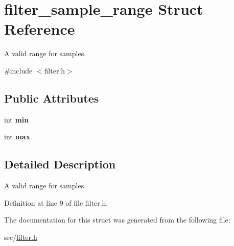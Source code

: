\hypertarget{structfilter__sample__range}{}\section{filter\+\_\+sample\+\_\+range Struct Reference}
\label{structfilter__sample__range}


A valid range for samples.  




{\ttfamily \#include $<$filter.\+h$>$}

\subsection*{Public Attributes}
\begin{DoxyCompactItemize}
\item 
\hypertarget{structfilter__sample__range_a304ee67b1a15b4a0f36ca190a56a38c7}{}int {\bfseries min}\label{structfilter__sample__range_a304ee67b1a15b4a0f36ca190a56a38c7}

\item 
\hypertarget{structfilter__sample__range_a0a29f8303981c999d499070d0a05e05d}{}int {\bfseries max}\label{structfilter__sample__range_a0a29f8303981c999d499070d0a05e05d}

\end{DoxyCompactItemize}


\subsection{Detailed Description}
A valid range for samples. 

Definition at line 9 of file filter.\+h.



The documentation for this struct was generated from the following file\+:\begin{DoxyCompactItemize}
\item 
src/\hyperlink{filter_8h}{filter.\+h}\end{DoxyCompactItemize}
